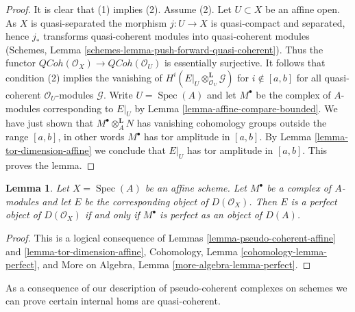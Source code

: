 \documentclass{stacks-project}
\theoremstyle{plain}
\newtheorem{lemma}[subsection]{Lemma}
\theoremstyle{definition}
\theoremstyle{remark}
\numberwithin{equation}{subsection}
\def\Spec{\mathop{\mathrm{Spec}}}
\def\QCoh{\mathit{QCoh}}
\begin{document}
\begin{proof}
It is clear that (1) implies (2). Assume (2). Let $U \subset X$ be
an affine open. As $X$ is quasi-separated the morphism $j : U \to X$
is quasi-compact and separated, hence $j_*$ transforms quasi-coherent
modules into quasi-coherent modules
(Schemes, Lemma \ref{schemes-lemma-push-forward-quasi-coherent}).
Thus the functor
$\QCoh(\mathcal{O}_X) \to \QCoh(\mathcal{O}_U)$
is essentially surjective. It follows that condition (2)
implies the vanishing of
$H^i(E|_U \otimes_{\mathcal{O}_U}^\mathbf{L} \mathcal{G})$
for $i \not \in [a, b]$ for all quasi-coherent $\mathcal{O}_U$-modules
$\mathcal{G}$. Write $U = \Spec(A)$ and let $M^\bullet$ be the
complex of $A$-modules corresponding to $E|_U$ by
Lemma \ref{lemma-affine-compare-bounded}.
We have just shown that $M^\bullet \otimes_A^\mathbf{L} N$
has vanishing cohomology groups outside the range $[a, b]$,
in other words $M^\bullet$ has tor amplitude in $[a, b]$.
By Lemma \ref{lemma-tor-dimension-affine}
we conclude that $E|_U$ has tor amplitude in $[a, b]$.
This proves the lemma.
\end{proof}

\begin{lemma}
\label{lemma-perfect-affine}
Let $X = \Spec(A)$ be an affine scheme. Let $M^\bullet$ be a
complex of $A$-modules and let $E$ be the corresponding object
of $D(\mathcal{O}_X)$. Then $E$ is a perfect object of $D(\mathcal{O}_X)$
if and only if $M^\bullet$ is perfect as an object of $D(A)$.
\end{lemma}

\begin{proof}
This is a logical consequence of
Lemmas \ref{lemma-pseudo-coherent-affine} and
\ref{lemma-tor-dimension-affine},
Cohomology, Lemma \ref{cohomology-lemma-perfect}, and
More on Algebra, Lemma \ref{more-algebra-lemma-perfect}.
\end{proof}

\noindent
As a consequence of our description of pseudo-coherent
complexes on schemes we can prove certain internal homs
are quasi-coherent.
\end{document}
